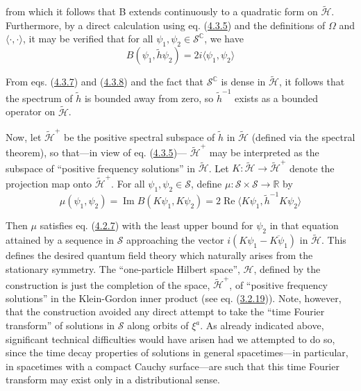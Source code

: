 \documentclass[11pt,a4paper]{article}
\begin{document}
from which it follows that B extends continuously to a quadratic form on \(\widetilde{\mathcal{H}}\). Furthermore, by a direct calculation using eq. (\hyperref[eq:4.3.5]{4.3.5}) and the definitions of \(\Omega\) and \(\langle\cdot,\cdot\rangle\), it may be verified that for all \(\psi_1, \psi_2 \in \mathcal{S}^{\mathbb{C}}\), we have
\begin{equation*}
B(\psi_1, \tilde{h}\psi_2) = 2 i \langle \psi_1, \psi_2\rangle \tag{4.3.8}\label{eq:4.3.8}
\end{equation*}

From eqs. (\hyperref[eq:4.3.7]{4.3.7}) and (\hyperref[eq:4.3.8]{4.3.8}) and the fact that \(\mathcal{S}^{\mathbb{C}}\) is dense in \(\widetilde{\mathcal{H}}\), it \hypertarget{source-76}{} follows that the spectrum of \(\tilde{h}\) is bounded away from zero, so \(\tilde{h}^{-1}\) exists as a bounded operator on \(\tilde{\mathcal{H}}\).

Now, let \(\widetilde{\mathcal{H}}^+\) be the positive spectral subspace of \(\widetilde{h}\) in \(\widetilde{\mathcal{H}}\) (defined via the spectral theorem), so that---in view of eq. (\hyperref[eq:4.3.5]{4.3.5})--- \(\widetilde{\mathcal{H}}^+\) may be interpreted as the subspace of ``positive frequency solutions'' in \(\widetilde{\mathcal{H}}\). Let \(K:\widetilde{\mathcal{H}}\to\widetilde{\mathcal{H}}^+\) denote the projection map onto \(\widetilde{\mathcal{H}}^+\). For all \(\psi_1,\psi_2\in \mathcal{S}\), define \(\mu:\mathcal{S}\times\mathcal{S}\to\mathbb{R}\) by
\begin{equation*}
\mu(\psi_1, \psi_2) = \operatorname{Im}B(K\psi_1, K\psi_2) = 2 \operatorname{Re} \langle K\psi_1, \tilde{h}^{-1}K\psi_2\rangle \tag{4.3.9}\label{eq:4.3.9}
\end{equation*}

Then \(\mu\) satisfies eq. (\hyperref[eq:4.2.7]{4.2.7}) with the least upper bound for \(\psi_2\) in that equation attained by a sequence in \(\mathcal{S}\) approaching the vector \(i(K\psi_1-\overline{K\psi_1})\) in \(\widetilde{\mathcal{H}}\). This defines the desired quantum field theory which naturally arises from the stationary symmetry. The ``one-particle Hilbert space'', \(\mathcal{H}\), defined by the construction is just the completion of the space, \(\widetilde{\mathcal{H}}^+\), of ``positive frequency solutions'' in the Klein-Gordon inner product (see eq. (\hyperref[eq:3.2.19]{3.2.19})). Note, however, that the construction avoided any direct attempt to take the ``time Fourier transform'' of solutions in \(\mathcal{S}\) along orbits of \(\xi^a\). As already indicated above, significant technical difficulties would have arisen had we attempted to do so, since the time decay properties of solutions in general spacetimes---in particular, in spacetimes with a compact Cauchy surface---are such that this time Fourier transform may exist only in a distributional sense.
\end{document}
